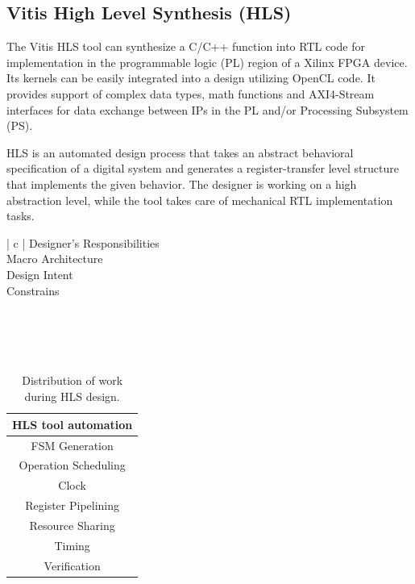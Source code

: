 \subsection{Vitis High Level Synthesis (HLS)}
The Vitis HLS tool can synthesize a C/C++ function into RTL code for implementation in the programmable logic (PL) region of a Xilinx FPGA device. Its kernels can be easily integrated into a design utilizing OpenCL\cite{OpenCL} code. It provides support of complex data types, math functions and AXI4-Stream interfaces for data exchange between IPs in the PL and/or Processing Subsystem (PS).

HLS is an automated design process that takes an abstract behavioral specification of a digital system and generates a register-transfer level structure that implements the given behavior. The designer is working on a high abstraction level, while the tool takes care of mechanical RTL implementation tasks.

\begin{table}[H]
    \center
    \begin{tabular}{ | c | }
        \hline
        Designer's Responsibilities\\
        \hline
        Macro Architecture\\
        Design Intent\\
        Constrains\\
        \hline
         \\
         \\
         \\
         \\
    \end{tabular}
    \quad
    \begin{tabular}{ | c | }
        \hline
        HLS tool automation\\
        \hline
        FSM Generation\\
        Operation Scheduling\\
        Clock\\
        Register Pipelining\\
        Resource Sharing\\
        Timing\\
        Verification\\
        \hline
    \end{tabular}
    \caption[HLS responsibilities]{Distribution of work during HLS design.}
    \label{HLS responsibilities}
\end{table}

